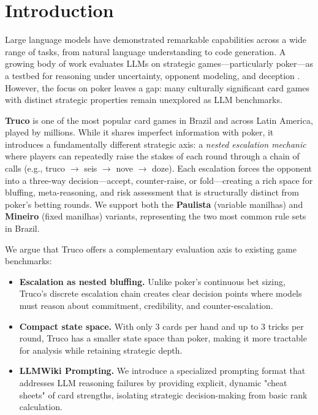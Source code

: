 \section{Introduction}

Large language models have demonstrated remarkable capabilities across a wide range of tasks, from natural language understanding to code generation. A growing body of work evaluates LLMs on strategic games---particularly poker---as a testbed for reasoning under uncertainty, opponent modeling, and deception \citep{zhuang2025pokerbench,maugin2025spingpt}. However, the focus on poker leaves a gap: many culturally significant card games with distinct strategic properties remain unexplored as LLM benchmarks.

\textbf{Truco} is one of the most popular card games in Brazil and across Latin America, played by millions. While it shares imperfect information with poker, it introduces a fundamentally different strategic axis: a \emph{nested escalation mechanic} where players can repeatedly raise the stakes of each round through a chain of calls (e.g., truco $\to$ seis $\to$ nove $\to$ doze). Each escalation forces the opponent into a three-way decision---accept, counter-raise, or fold---creating a rich space for bluffing, meta-reasoning, and risk assessment that is structurally distinct from poker's betting rounds. We support both the \textbf{Paulista} (variable manilhas) and \textbf{Mineiro} (fixed manilhas) variants, representing the two most common rule sets in Brazil.

We argue that Truco offers a complementary evaluation axis to existing game benchmarks:
\begin{itemize}
    \item \textbf{Escalation as nested bluffing.} Unlike poker's continuous bet sizing, Truco's discrete escalation chain creates clear decision points where models must reason about commitment, credibility, and counter-escalation.
    \item \textbf{Compact state space.} With only 3 cards per hand and up to 3 tricks per round, Truco has a smaller state space than poker, making it more tractable for analysis while retaining strategic depth.
    \item \textbf{LLMWiki Prompting.} We introduce a specialized prompting format that addresses LLM reasoning failures by providing explicit, dynamic "cheat sheets" of card strengths, isolating strategic decision-making from basic rank calculation.
\end{itemize}

